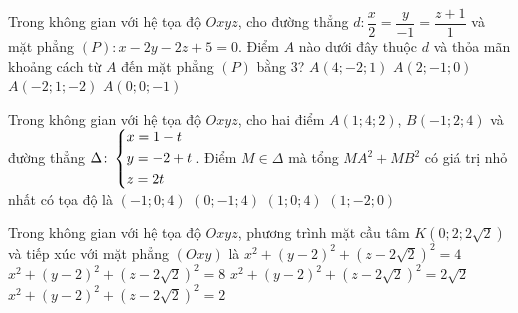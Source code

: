 \begin{ex}%
	Trong không gian với hệ tọa độ $ Oxyz $, cho đường thẳng $ d\colon \dfrac{x}{2}=\dfrac{y}{-1}=\dfrac{z+1}{1} $ và mặt phẳng $ (P)\colon x-2y-2z+5=0 $. Điểm $ A $ nào dưới đây thuộc $ d $ và thỏa mãn khoảng cách từ $ A $ đến mặt phẳng $ (P) $ bằng $ 3 $?
	\choice
	{$A(4;-2;1) $}
	{$A(2;-1;0) $}
	{$A(-2;1;-2) $}
	{\True $A(0;0;-1) $}
\end{ex}
\begin{ex}%
	Trong không gian với hệ tọa độ $ Oxyz $, cho hai điểm $ A(1;4;2) $, $ B(-1;2;4) $ và đường thẳng $ \Delta\colon\left\{\begin{aligned}&x=1-t\\ &y=-2+t\\ &z=2t\end{aligned}\right. $. Điểm $ M\in\Delta $ mà tổng $ MA^{2}+MB^{2} $ có giá trị nhỏ nhất có tọa độ là
	\choice
	{\True $ (-1;0;4) $}
	{$ (0;-1;4) $}
	{$ (1;0;4) $}
	{$ (1;-2;0) $}
\end{ex}
\begin{ex}%
	Trong không gian với hệ tọa độ $ Oxyz $, phương trình mặt cầu tâm $ K(0;2;2\sqrt{2}) $ và tiếp xúc với mặt phẳng $ (Oxy) $ là
	\choice
	{$ x^{2}+(y-2)^{2}+(z-2\sqrt{2})^{2}=4 $}
	{\True $ x^{2}+(y-2)^{2}+(z-2\sqrt{2})^{2}=8 $}
	{$ x^{2}+(y-2)^{2}+(z-2\sqrt{2})^{2}=2\sqrt{2} $}
	{$ x^{2}+(y-2)^{2}+(z-2\sqrt{2})^{2}=2 $}
\end{ex}
